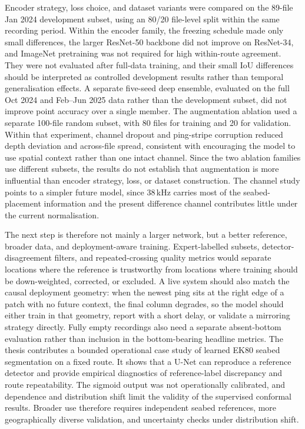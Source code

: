 Encoder strategy, loss choice, and dataset variants were compared on the 89-file Jan 2024 development subset, using an 80/20 file-level split within the same recording period. Within the encoder family, the freezing schedule made only small differences, the larger ResNet-50 backbone did not improve on ResNet-34, and ImageNet pretraining was not required for high within-route agreement. They were not evaluated after full-data training, and their small IoU differences should be interpreted as controlled development results rather than temporal generalisation effects. A separate five-seed deep ensemble, evaluated on the full Oct 2024 and Feb--Jun 2025 data rather than the development subset, did not improve point accuracy over a single member. The augmentation ablation used a separate 100-file random subset, with 80 files for training and 20 for validation. Within that experiment, channel dropout and ping-stripe corruption reduced depth deviation and across-file spread, consistent with encouraging the model to use spatial context rather than one intact channel. Since the two ablation families use different subsets, the results do not establish that augmentation is more influential than encoder strategy, loss, or dataset construction. The channel study points to a simpler future model, since 38\,kHz carries most of the seabed-placement information and the present difference channel contributes little under the current normalisation.

The next step is therefore not mainly a larger network, but a better reference, broader data, and deployment-aware training. Expert-labelled subsets, detector-disagreement filters, and repeated-crossing quality metrics would separate locations where the reference is trustworthy from locations where training should be down-weighted, corrected, or excluded. A live system should also match the causal deployment geometry: when the newest ping sits at the right edge of a patch with no future context, the final column degrades, so the model should either train in that geometry, report with a short delay, or validate a mirroring strategy directly. Fully empty recordings also need a separate absent-bottom evaluation rather than inclusion in the bottom-bearing headline metrics. The thesis contributes a bounded operational case study of learned EK80 seabed segmentation on a fixed route. It shows that a U-Net can reproduce a reference detector and provide empirical diagnostics of reference-label discrepancy and route repeatability. The sigmoid output was not operationally calibrated, and dependence and distribution shift limit the validity of the supervised conformal results. Broader use therefore requires independent seabed references, more geographically diverse validation, and uncertainty checks under distribution shift.

